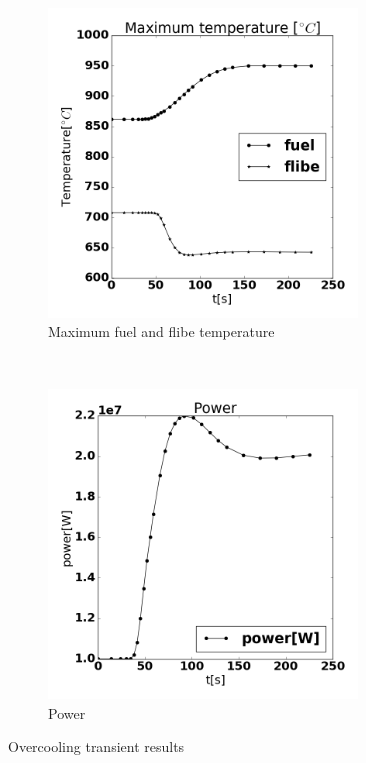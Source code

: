 \documentclass{elsarticle}
\begin{document}
\begin{figure}[h!]
    \centering
    \begin{subfigure}[b]{0.45\columnwidth}
        \centering
        \includegraphics[width=0.9\textwidth]{./images/diffusion/OC/T_fuel_flibe_max.png}
        \caption{Maximum fuel and flibe temperature}
    \end{subfigure}%
    ~
    \begin{subfigure}[b]{0.45\columnwidth}
        \centering
        \includegraphics[width=0.9\textwidth]{./images/diffusion/OC/power.png}
        \caption{Power}
    \end{subfigure}
    \caption{Overcooling transient results}
    \label{fig:OC}
\end{figure}
\end{document}
